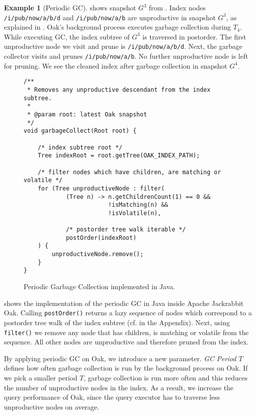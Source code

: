 \documentclass[abstracton,12pt]{scrartcl}
\theoremstyle{definition}
\newtheorem{example}{Example}
\begin{document}
\begin{example}[Periodic GC]
   shows snapshot $G^3$ from
  . Index nodes \texttt{/i/pub/now/a/b/d}
  and \texttt{/i/pub/now/a/b} are unproductive in snapshot $G^3$, as explained
  in . Oak's background process executes garbage
  collection during $T_4$. While executing GC, the index subtree of $G^3$ is
  traversed in postorder.
  The first unproductive node we visit and prune is
  \texttt{/i/pub/now/a/b/d}. Next, the garbage collector visits and prunes
  \texttt{/i/pub/now/a/b}. No further unproductive node is left for pruning. We
  see the cleaned index after garbage collection in snapshot $G^4$.
\end{example}

\begin{figure}[H]
  \small
  \begin{framed}
\begin{verbatim}
/**
 * Removes any unproductive descendant from the index subtree.
 *
 * @param root: latest Oak snapshot 
 */
void garbageCollect(Root root) {

    /* index subtree root */
    Tree indexRoot = root.getTree(OAK_INDEX_PATH);

    /* filter nodes which have children, are matching or volatile */
    for (Tree unproductiveNode : filter(
            (Tree n) -> n.getChildrenCount(1) == 0 &&
                        !isMatching(n) &&
                        !isVolatile(n),

            /* postorder tree walk iterable */
            postOrder(indexRoot)
    ) {
        unproductiveNode.remove();
    }
}
\end{verbatim}
  \end{framed}
  \caption[Periodic GC implemented in Java]{Periodic Garbage Collection
    implemented in Java.}
  \label{fig:java_periodic_gc}
\end{figure}

 shows the implementation of the periodic
GC in Java \cite{Java} inside Apache Jackrabbit Oak. Calling \texttt{postOrder()} returns a
lazy sequence of nodes
which correspond to a postorder tree walk of the index subtree (cf.
 in the Appendix). Next, using \texttt{filter()} we
remove any node
that has children, is matching or volatile from the sequence. All other nodes are
unproductive and therefore pruned from the index.

By applying periodic GC on Oak, we introduce a new
parameter. \textit{GC Period $T$} defines how often garbage collection is run by
the background process on Oak. If we pick a smaller
period $T$, garbage collection is run more often and this
reduces the number of unproductive nodes in the index. As a result, we
increase the query performance of Oak,
since the query executor has to traverse less unproductive nodes on average.
\end{document}

